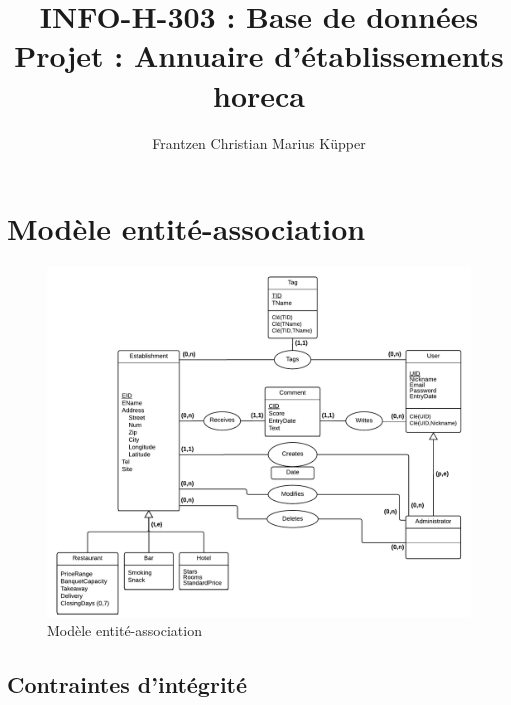 \documentclass[11pt,a4paper]{report}
\author{Frantzen Christian Marius Küpper}
\title{INFO-H-303 : Base de données\\
		Projet : Annuaire d'établissements horeca}
\begin{document}
\maketitle
\section*{Modèle entité-association}

\begin{figure}[h]
  \centering
  \includegraphics[width=\textwidth]{modelEA.pdf}
  \caption{Modèle entité-association}
\end{figure}


\subsection*{Contraintes d'intégrité}
\end{document}
